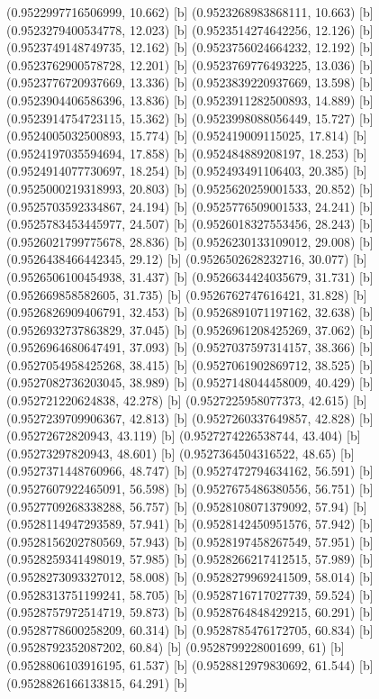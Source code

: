 {{{(0.9522997716506999, 10.662) [b] 
(0.9523268983868111, 10.663) [b] 
(0.9523279400534778, 12.023) [b] 
(0.9523514274642256, 12.126) [b] 
(0.9523749148749735, 12.162) [b] 
(0.9523756024664232, 12.192) [b] 
(0.9523762900578728, 12.201) [b] 
(0.9523769776493225, 13.036) [b] 
(0.9523776720937669, 13.336) [b] 
(0.9523839220937669, 13.598) [b] 
(0.9523904406586396, 13.836) [b] 
(0.9523911282500893, 14.889) [b] 
(0.9523914754723115, 15.362) [b] 
(0.9523998088056449, 15.727) [b] 
(0.9524005032500893, 15.774) [b] 
(0.952419009115025, 17.814) [b] 
(0.9524197035594694, 17.858) [b] 
(0.952484889208197, 18.253) [b] 
(0.9524914077730697, 18.254) [b] 
(0.952493491106403, 20.385) [b] 
(0.9525000219318993, 20.803) [b] 
(0.9525620259001533, 20.852) [b] 
(0.9525703592334867, 24.194) [b] 
(0.9525776509001533, 24.241) [b] 
(0.9525783453445977, 24.507) [b] 
(0.9526018327553456, 28.243) [b] 
(0.9526021799775678, 28.836) [b] 
(0.9526230133109012, 29.008) [b] 
(0.9526438466442345, 29.12) [b] 
(0.9526502628232716, 30.077) [b] 
(0.9526506100454938, 31.437) [b] 
(0.9526634424035679, 31.731) [b] 
(0.952669858582605, 31.735) [b] 
(0.9526762747616421, 31.828) [b] 
(0.9526826909406791, 32.453) [b] 
(0.9526891071197162, 32.638) [b] 
(0.9526932737863829, 37.045) [b] 
(0.9526961208425269, 37.062) [b] 
(0.9526964680647491, 37.093) [b] 
(0.9527037597314157, 38.366) [b] 
(0.9527054958425268, 38.415) [b] 
(0.9527061902869712, 38.525) [b] 
(0.9527082736203045, 38.989) [b] 
(0.9527148044458009, 40.429) [b] 
(0.952721220624838, 42.278) [b] 
(0.9527225958077373, 42.615) [b] 
(0.9527239709906367, 42.813) [b] 
(0.9527260337649857, 42.828) [b] 
(0.95272672820943, 43.119) [b] 
(0.9527274226538744, 43.404) [b] 
(0.95273297820943, 48.601) [b] 
(0.9527364504316522, 48.65) [b] 
(0.9527371448760966, 48.747) [b] 
(0.9527472794634162, 56.591) [b] 
(0.9527607922465091, 56.598) [b] 
(0.9527675486380556, 56.751) [b] 
(0.9527709268338288, 56.757) [b] 
(0.9528108071379092, 57.94) [b] 
(0.9528114947293589, 57.941) [b] 
(0.9528142450951576, 57.942) [b] 
(0.9528156202780569, 57.943) [b] 
(0.9528197458267549, 57.951) [b] 
(0.9528259341498019, 57.985) [b] 
(0.9528266217412515, 57.989) [b] 
(0.9528273093327012, 58.008) [b] 
(0.9528279969241509, 58.014) [b] 
(0.9528313751199241, 58.705) [b] 
(0.9528716717027739, 59.524) [b] 
(0.9528757972514719, 59.873) [b] 
(0.9528764848429215, 60.291) [b] 
(0.9528778600258209, 60.314) [b] 
(0.9528785476172705, 60.834) [b] 
(0.9528792352087202, 60.84) [b] 
(0.9528799228001699, 61) [b] 
(0.9528806103916195, 61.537) [b] 
(0.9528812979830692, 61.544) [b] 
(0.9528826166133815, 64.291) [b] 
}}}
